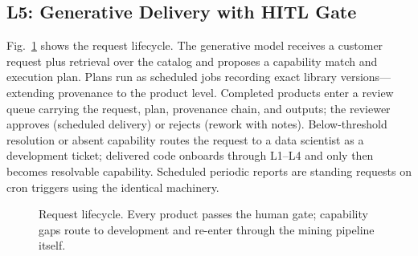 \documentclass[conference]{IEEEtran}
\begin{document}
\subsection{L5: Generative Delivery with HITL Gate}
Fig.~\ref{fig:lifecycle} shows the request lifecycle. The generative model receives a customer request plus retrieval over the catalog and proposes a capability match and execution plan. Plans run as scheduled jobs recording exact library versions---extending provenance to the product level. Completed products enter a review queue carrying the request, plan, provenance chain, and outputs; the reviewer approves (scheduled delivery) or rejects (rework with notes). Below-threshold resolution or absent capability routes the request to a data scientist as a development ticket; delivered code onboards through L1--L4 and only then becomes resolvable capability. Scheduled periodic reports are standing requests on cron triggers using the identical machinery.

\begin{figure}[t]
\centering
{}
\caption{Request lifecycle. Every product passes the human gate; capability gaps route to development and re-enter through the mining pipeline itself.}
\label{fig:lifecycle}
\end{figure}
\end{document}
